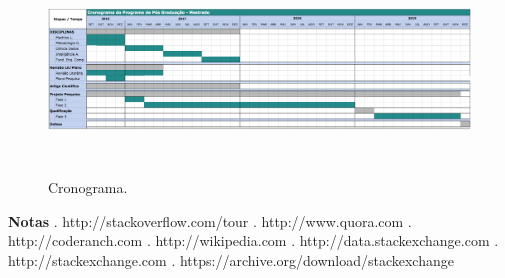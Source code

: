 \documentclass[10pt,a4paper,final]{article}
\begin{document}

\begin{figure}[!htb]
\centering
\includegraphics[height=4.8cm]{Figures/cronograma_projeto_project_timeline_retrato}\label{fig:cronograma_projeto_project_timeline_retrato}   
\caption{Cronograma.}
\end{figure}



\textbf{\newline Notas}
\newline
{}. http://stackoverflow.com/tour . http://www.quora.com . http://coderanch.com . http://wikipedia.com . http://data.stackexchange.com . http://stackexchange.com . https://archive.org/download/stackexchange

\nocite{Joorabchi2015}
\nocite{Manning2009}
\nocite{Mihalcea2007}
\nocite{Mihalcea2001}
\nocite{Mihalcea2004}
\nocite{Milne}
\nocite{Miotto2013}
\nocite{Posch2014}
\nocite{Roul2015}
\nocite{Udell2005}

{}  


    
\end{document}
